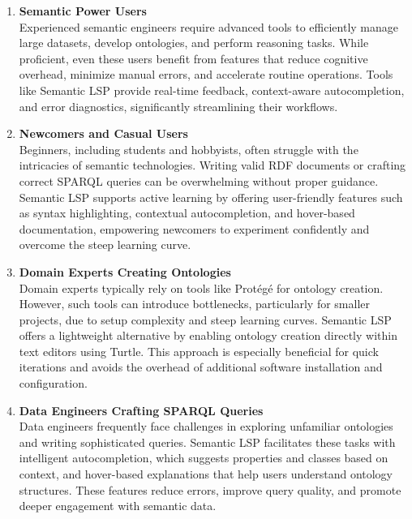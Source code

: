 \begin{enumerate}
  \item \textbf{Semantic Power Users}\\
    Experienced semantic engineers require advanced tools to efficiently manage large datasets, develop ontologies, and perform reasoning tasks.
    While proficient, even these users benefit from features that reduce cognitive overhead, minimize manual errors, and accelerate routine operations.
    Tools like Semantic LSP provide real-time feedback, context-aware autocompletion, and error diagnostics, significantly streamlining their workflows.

  \item \textbf{Newcomers and Casual Users}\\
    Beginners, including students and hobbyists, often struggle with the intricacies of semantic technologies\cite{EvensteinSigalov2023,Turki2021RepresentingCI}. 
    Writing valid RDF documents or crafting correct SPARQL queries can be overwhelming without proper guidance. 
    Semantic LSP supports active learning by offering user-friendly features such as syntax highlighting, contextual autocompletion, and hover-based documentation, empowering newcomers to experiment confidently and overcome the steep learning curve.


\item \textbf{Domain Experts Creating Ontologies}\\
    Domain experts typically rely on tools like Protégé for ontology creation. 
    However, such tools can introduce bottlenecks, particularly for smaller projects, due to setup complexity and steep learning curves. 
    Semantic LSP offers a lightweight alternative by enabling ontology creation directly within text editors using Turtle.
    This approach is especially beneficial for quick iterations and avoids the overhead of additional software installation and configuration.

  \item \textbf{Data Engineers Crafting SPARQL Queries}\\
    Data engineers frequently face challenges in exploring unfamiliar ontologies and writing sophisticated queries. 
    Semantic LSP facilitates these tasks with intelligent autocompletion, which suggests properties and classes based on context, and hover-based explanations that help users understand ontology structures.
    These features reduce errors, improve query quality, and promote deeper engagement with semantic data.
\end{enumerate}

